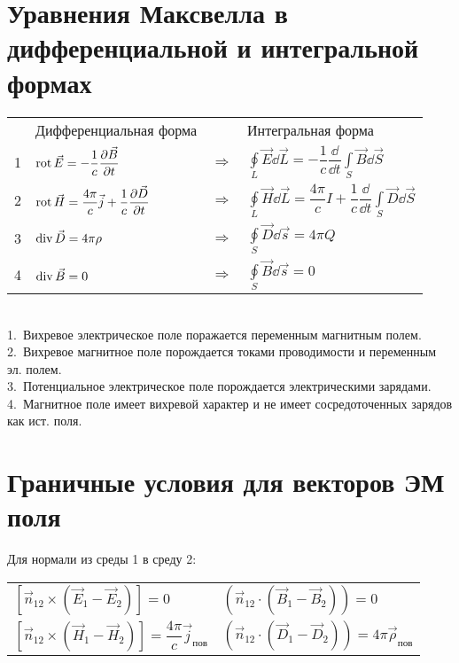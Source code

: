 \begin{multicols*}{2}
		\section{Уравнения Максвелла в дифференциальной и интегральной формах}
        \begin{tabular}{c|lcl|}
            {} & {Дифференциальная форма} & {} & {Интегральная форма} \\
            {1} & {$\operatorname{rot}\vec{E}=-\dfrac1c\dfrac{\partial{\vec{B}}}{\partial{t}}$} & {$\Rightarrow$} & { $\oint\limits_L\vec{E}\dd\vec{L}=-\dfrac1c\dfrac\dd{\dd{t}}\int\limits_S\vec{B}\dd{\vec{S}}$} \\

            {2} & {$\operatorname{rot}\vec{H} = \dfrac{4\pi}{c}\vec{j} + \dfrac1c\dfrac{\partial{\vec{D}}}{\partial{t}}$} & {$\Rightarrow$} & {$\oint\limits_L\vec{H}\dd\vec{L} = \dfrac{4\pi}{c}I+\dfrac1c\dfrac\dd{\dd{t}}\int\limits_S\vec{D}\dd{\vec{S}}$} \\

            {3} & {$\operatorname{div}\vec{D}=4\pi \rho$} & {$\Rightarrow$} & {$\oint\limits_S\vec{D}\dd{\vec{s}}=4\pi Q$} \\

            {4} & {$\operatorname{div}\vec{B}=0$} & {$\Rightarrow$} & {$\oint\limits_S\vec{B}\dd{\vec{s}}=0$}
         \end{tabular} \\
         1.~Вихревое электрическое поле поражается переменным магнитным полем. \\
         2.~Вихревое магнитное поле порождается токами проводимости и переменным эл. полем. \\
         3.~Потенциальное электрическое поле порождается электрическими зарядами. \\
         4.~Магнитное поле имеет вихревой характер и не имеет сосредоточенных зарядов как ист. поля.

		\section{Граничные условия для векторов ЭМ поля}
        Для нормали из среды 1 в среду 2: \\
        \begin{tabular}{l|l}
            $\left[\vec{n}_{12}\times(\vec E_1-\vec E_2)\right]=0$ &
            $\left(\vec{n}_{12}\cdot(\vec B_1-\vec B_2)\right)=0$ \\
            $\left[\vec{n}_{12}\times(\vec H_1-\vec H_2)\right]=\dfrac{4\pi}{c}\vec j_{\text{пов}}$ &
            $\left(\vec{n}_{12}\cdot(\vec D_1-\vec D_2)\right)=4\pi\vec \rho_{\text{пов}}$
        \end{tabular}


\end{multicols*}
